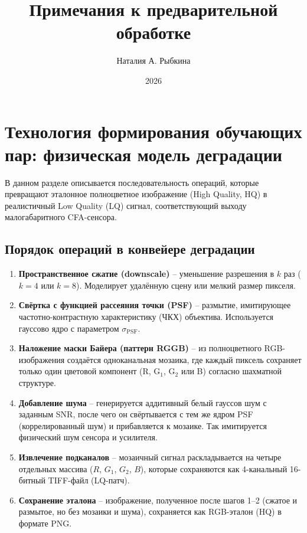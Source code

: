 \documentclass[12pt,a4paper]{article}
\title{Примечания к предварительной обработке}
\author{Наталия А. Рыбкина}
\date{2026}
\begin{document}
\maketitle

\section{Технология формирования обучающих пар: физическая модель деградации}
\label{sec:bayer_preparation}

В данном разделе описывается последовательность операций, которые превращают эталонное полноцветное изображение (High Quality, HQ) в реалистичный Low Quality (LQ) сигнал, соответствующий выходу малогабаритного CFA-сенсора.

\subsection{Порядок операций в конвейере деградации}

\begin{enumerate}
    \item \textbf{Пространственное сжатие (downscale)} – уменьшение разрешения в $k$ раз ($k=4$ или $k=8$). Моделирует удалённую сцену или мелкий размер пикселя.
    \item \textbf{Свёртка с функцией рассеяния точки (PSF)} – размытие, имитирующее частотно-контрастную характеристику (ЧКХ) объектива. Используется гауссово ядро с параметром $\sigma_{\text{PSF}}$.
    \item \textbf{Наложение маски Байера (паттерн RGGB)} – из полноцветного RGB-изображения создаётся одноканальная мозаика, где каждый пиксель сохраняет только один цветовой компонент (R, G$_1$, G$_2$ или B) согласно шахматной структуре.
    \item \textbf{Добавление шума} – генерируется аддитивный белый гауссов шум с заданным SNR, после чего он свёртывается с тем же ядром PSF (коррелированный шум) и прибавляется к мозаике. Так имитируется физический шум сенсора и усилителя.
    \item \textbf{Извлечение подканалов} – мозаичный сигнал раскладывается на четыре отдельных массива ($R$, $G_1$, $G_2$, $B$), которые сохраняются как 4-канальный 16-битный TIFF-файл (LQ-патч).
    \item \textbf{Сохранение эталона} – изображение, полученное после шагов 1–2 (сжатое и размытое, но без мозаики и шума), сохраняется как RGB-эталон (HQ) в формате PNG.
\end{enumerate}
\end{document}
